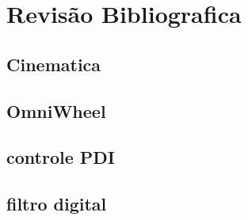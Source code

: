 
\chapter{Revisão Bibliografica}

\section{Cinematica}


\section{OmniWheel}


\section{controle PDI}


\section{filtro digital}


